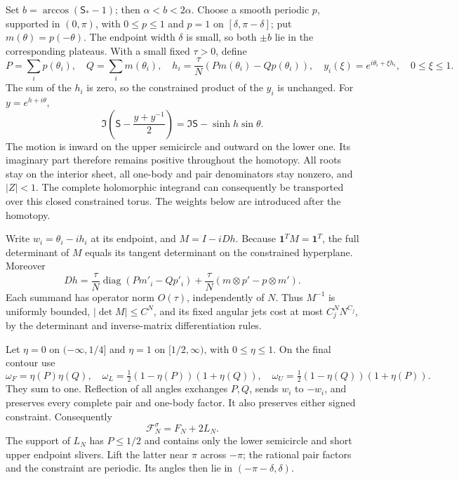\documentclass[11pt]{article}
\numberwithin{equation}{section}
\theoremstyle{definition}
\begin{document}
Set $b=\arccos(\mathsf S_*-1)$; then $\alpha<b<2\alpha$.
Choose a smooth periodic $p$, supported in $(0,\pi)$, with
$0\le p\le1$ and $p=1$ on $[\delta,\pi-\delta]$; put
$m(\theta)=p(-\theta)$.  The endpoint width $\delta$ is small,
so both $\pm b$ lie in the corresponding plateaus.  With a small
fixed $\tau>0$, define
\begin{equation}\label{eq:iso-balanced-deformation}
 P=\sum_i p(\theta_i),\quad Q=\sum_i m(\theta_i),\quad
 h_i=\frac\tau N(Pm(\theta_i)-Qp(\theta_i)),\quad
 y_i(\xi)=e^{i\theta_i+\xi h_i},\quad 0\le\xi\le1.
\end{equation}
The sum of the $h_i$ is zero, so the constrained product of the $y_i$
is unchanged.  For $y=e^{h+i\theta}$,
\[
 \Im\left(\mathsf S-\frac{y+y^{-1}}2\right)
       =\Im\mathsf S-\sinh h\sin\theta.
\]
The motion is inward on the upper semicircle and outward on the lower
one.  Its imaginary part therefore remains positive throughout the
homotopy.  All roots stay on the interior sheet, all one-body and pair
denominators stay nonzero, and $|Z|<1$.  The complete holomorphic
integrand can consequently be transported over this closed constrained
torus.  The weights below are introduced after the homotopy.

Write $w_i=\theta_i-ih_i$ at its endpoint, and $M=I-iDh$.
Because $\boldsymbol1^TM=\boldsymbol1^T$, the full determinant of $M$
equals its tangent determinant on the constrained hyperplane.  Moreover
\[
 Dh=\frac\tau N\operatorname{diag}(Pm'_i-Qp'_i)
       +\frac\tau N(m\otimes p'-p\otimes m').
\]
Each summand has operator norm $O(\tau)$, independently of $N$.
Thus $M^{-1}$ is uniformly bounded, $|\det M|\le C^N$, and its
fixed angular jets cost at most $C_j^NN^{C_j}$, by the determinant
and inverse-matrix differentiation rules.

Let $\eta=0$ on $(-\infty,1/4]$ and $\eta=1$ on $[1/2,\infty)$,
with $0\le\eta\le1$.  On the final contour use
\[
 \omega_F=\eta(P)\eta(Q),\quad
 \omega_L=\tfrac12(1-\eta(P))(1+\eta(Q)),\quad
 \omega_U=\tfrac12(1-\eta(Q))(1+\eta(P)).
\]
They sum to one.  Reflection of all angles exchanges $P,Q$, sends
$w_i$ to $-w_i$, and preserves every complete pair and one-body factor.
It also preserves either signed constraint.  Consequently
\begin{equation}\label{eq:iso-exact-split}
 \mathcal F_N^\sigma=F_N+2L_N.
\end{equation}
The support of $L_N$ has $P\le1/2$ and contains only the lower
semicircle and short upper endpoint slivers.  Lift the latter near
$\pi$ across $-\pi$; the rational pair factors and the constraint are
periodic.  Its angles then lie in $(-\pi-\delta,\delta)$.
\end{document}
